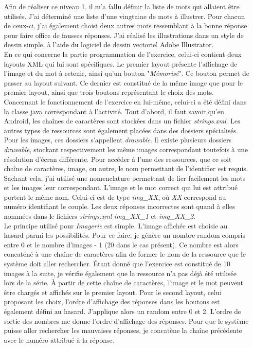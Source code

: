 Afin de réaliser ce niveau 1, il m'a fallu définir la liste de mots qui allaient être utilisés. J'ai déterminé une liste d'une vingtaine de mots à illustrer. Pour chacun de ceux-ci, j'ai également choisi deux autres mots ressemblant à la bonne réponse pour faire office de fausses réponses. J'ai réalisé les illustrations dans un style de dessin simple, à l'aide du logiciel de dessin vectoriel Adobe Illustrator. \\


En ce qui concerne la partie programmation de l'exercice, celui-ci contient deux layouts XML qui lui sont spécifiques. Le premier layout présente l'affichage de l'image et du mot à retenir, ainsi qu'un bouton "\textit{Mémorisé}". Ce bouton permet de passer au layout suivant. Ce dernier est constitué de la même image que pour le premier layout, ainsi que trois boutons représentant le choix des mots.\\

Concernant le fonctionnement de l'exercice en lui-même, celui-ci a été défini dans la classe java correspondant à l'activité. Tout d'abord, il faut savoir qu'en Android, les chaînes de caractères sont stockées dans un fichier \textit{strings.xml}. Les autres types de ressources sont également placées dans des dossiers spécialisés. Pour les images, ces dossiers s'appellent \textit{drawable}. Il existe plusieurs dossiers \textit{drawable}, stockant respectivement les même images correspondant toutefois à une résolution d'écran différente. Pour accéder à l'une des ressources, que ce soit chaîne de caractères, image, ou autre, le nom permettant de l'identifier est requis. Sachant cela, j'ai utilisé une nomenclature permettant de lier facilement les mots et les images leur correspondant. L'image et le mot correct qui lui est attribué portent le même nom. Celui-ci est de type \textit{img\_XX}, où \textit{XX} correspond au numéro identifiant le couple. Les deux réponses incorrectes sont quand à elles nommées dans le fichiers \textit{strings.xml} \textit{img\_XX\_1} et \textit{img\_XX\_2}.\\

Le principe utilisé pour \textit{Imagerie} est simple. L'image affichée est choisie au hasard parmi les possibilités. Pour ce faire, je génère un nombre random compris entre 0 et le nombre d'images - 1 (20 dans le cas présent). Ce nombre est alors concaténé à une chaîne de caractères afin de former le nom de la ressource que le système doit aller rechercher. Étant donné que l'exercice est constitué de 10 images à la suite, je vérifie également que la ressource n'a pas déjà été utilisée lors de la série. À partir de cette chaîne de caractères, l'image et le mot peuvent être chargés et affichés sur le premier layout. Pour le second layout, celui proposant les choix, l'ordre d'affichage des réponses dans les boutons est également défini au hasard. J'applique alors un random entre 0 et 2. L'ordre de sortie des nombres me donne l'ordre d'affichage des réponses. Pour que le système puisse aller rechercher les mauvaises réponses, je concatène la chaîne précédente avec le numéro attribué à la réponse.\\

